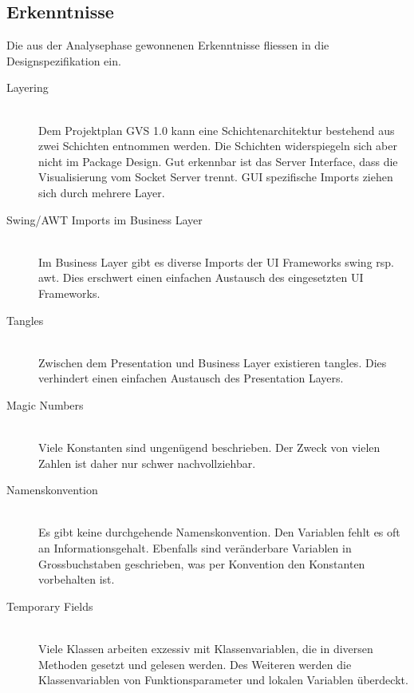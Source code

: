 \documentclass[11pt,a4paper,english,oneside]{book}
\numberwithin{equation}{chapter}
\begin{document}
	\clearpage
	
	\subsection{Erkenntnisse} \label{sec:erkenntnisse}
	Die aus der Analysephase gewonnenen Erkenntnisse fliessen in die Designspezifikation ein.
		
	\begin{description}
	\item[Layering] \hfill \\
	Dem Projektplan GVS 1.0 \cite{gvs1} kann eine Schichtenarchitektur bestehend aus zwei Schichten entnommen werden. Die Schichten widerspiegeln sich aber nicht im Package Design. Gut erkennbar ist das Server Interface, dass die Visualisierung vom Socket Server trennt. GUI spezifische Imports ziehen sich durch mehrere Layer.
	
	\item[Swing/AWT Imports im Business Layer] \hfill \\ \label{sssec:swing-business}
	Im Business Layer gibt es diverse Imports der UI Frameworks \gls{swing} rsp. \gls{awt}. Dies erschwert einen einfachen Austausch des eingesetzten UI Frameworks.
	
	\item[Tangles] \hfill \\
	Zwischen dem Presentation und Business Layer existieren \gls{tangle}s. Dies verhindert einen einfachen Austausch des Presentation Layers. 
	
	\item[Magic Numbers] \hfill \\
	Viele Konstanten sind ungenügend beschrieben. Der Zweck von vielen Zahlen ist daher nur schwer nachvollziehbar.
	
	\item[Namenskonvention] \hfill \\
	Es gibt keine durchgehende Namenskonvention. Den Variablen fehlt es oft an Informationsgehalt. Ebenfalls sind veränderbare Variablen in Grossbuchstaben geschrieben, was per Konvention \cite{jls-naming} den Konstanten vorbehalten ist.
	
	\item[Temporary Fields] \hfill \\
	Viele Klassen arbeiten exzessiv mit Klassenvariablen, die in diversen Methoden gesetzt und gelesen werden. Des Weiteren werden die Klassenvariablen von Funktionsparameter und lokalen Variablen überdeckt.   
	

\end{description}
\end{document}

